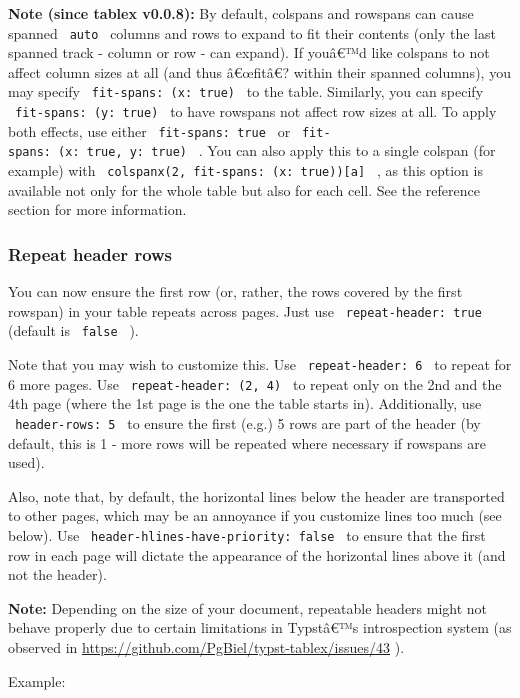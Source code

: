 \textbf{Note (since tablex v0.0.8):} By default, colspans and rowspans
can cause spanned \texttt{\ auto\ } columns and rows to expand to fit
their contents (only the last spanned track - column or row - can
expand). If youâ€™d like colspans to not affect column sizes at all (and
thus â€œfitâ€? within their spanned columns), you may specify
\texttt{\ fit-spans:\ (x:\ true)\ } to the table. Similarly, you can
specify \texttt{\ fit-spans:\ (y:\ true)\ } to have rowspans not affect
row sizes at all. To apply both effects, use either
\texttt{\ fit-spans:\ true\ } or
\texttt{\ fit-spans:\ (x:\ true,\ y:\ true)\ } . You can also apply this
to a single colspan (for example) with
\texttt{\ colspanx(2,\ fit-spans:\ (x:\ true)){[}a{]}\ } , as this
option is available not only for the whole table but also for each cell.
See the reference section for more information.

\subsubsection{Repeat header rows}\label{repeat-header-rows}

You can now ensure the first row (or, rather, the rows covered by the
first rowspan) in your table repeats across pages. Just use
\texttt{\ repeat-header:\ true\ } (default is \texttt{\ false\ } ).

Note that you may wish to customize this. Use
\texttt{\ repeat-header:\ 6\ } to repeat for 6 more pages. Use
\texttt{\ repeat-header:\ (2,\ 4)\ } to repeat only on the 2nd and the
4th page (where the 1st page is the one the table starts in).
Additionally, use \texttt{\ header-rows:\ 5\ } to ensure the first
(e.g.) 5 rows are part of the header (by default, this is 1 - more rows
will be repeated where necessary if rowspans are used).

Also, note that, by default, the horizontal lines below the header are
transported to other pages, which may be an annoyance if you customize
lines too much (see below). Use
\texttt{\ header-hlines-have-priority:\ false\ } to ensure that the
first row in each page will dictate the appearance of the horizontal
lines above it (and not the header).

\textbf{Note:} Depending on the size of your document, repeatable
headers might not behave properly due to certain limitations in
Typstâ€™s introspection system (as observed in
\url{https://github.com/PgBiel/typst-tablex/issues/43} ).

Example:

